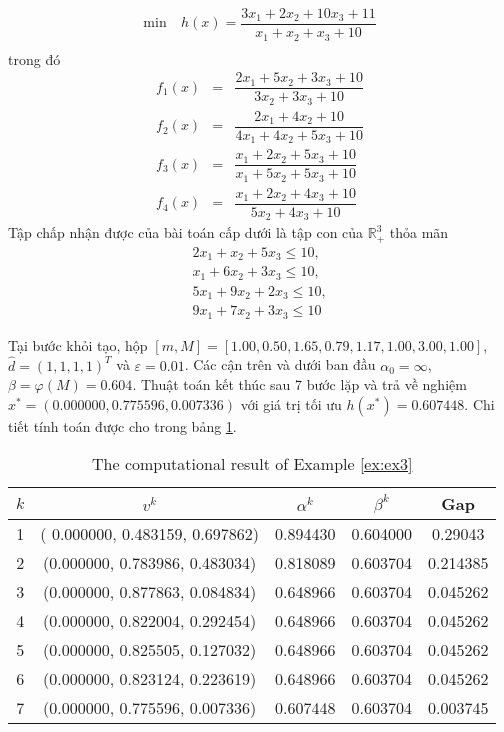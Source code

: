 \begin{vd} 
\noindent  \label{ex:ex3}
\begin{align*}
    \min &\ h(x) = \dfrac{3x_1 + 2x_2 + 10x_3 +11}{x_1 + x_2 +x_3 +10}\\
\end{align*}
trong đó 
\[
\begin{array}{ccl}
    f_1(x) & = & \dfrac{2x_{1}+5x_{2}+3x_{3}+10}{3x_{2}+3x_{3}+10} \\
    f_2(x) & = & \dfrac{2x_{1}+4x_{2}+10}{4x_{1}+4x_{2}+5x_{3}+10} \\
    f_3(x) & = & \dfrac{x_{1}+2x_{2}+5x_{3}+10}{x_{1}+5x_{2}+5x_{3}+10}\\
    f_4(x) & = & \dfrac{x_{1}+2x_{2}+4x_{3}+10}{5x_{2}+4x_{3}+10}
\end{array}
\]
Tập chấp nhận được của bài toán cấp dưới là tập con của $\mathbb{R}^3_+$ thỏa mãn
\begin{align*}
    2x_{1}+x_{2}+5x_{3} \leq 10, \\
    x_{1}+6x_{2}+3x_{3} \leq 10,\\ 
    5x_{1}+9x_{2}+2x_{3} \leq 10,\\ 
    9x_{1}+7x_{2}+3x_{3} \leq 10
\end{align*}
\end{vd}

Tại bước khỏi tạo, hộp $[m,M] =[1.00,0.50,1.65,0.79,1.17,1.00,3.00,1.00]$, $\hat{d}=(1, 1, 1, 1)^{T}$ và $\varepsilon=0.01$.
Các cận trên và dưới ban đầu $\alpha_{0}=\infty$, $\beta=\varphi(M)=0.604$. Thuật toán kết thúc sau 7 bước lặp và trả về nghiệm $x^{*}=(0.000000, 0.775596, 0.007336)$ với giá trị tối ưu $h(x^{*})=0.607448$. Chi tiết tính toán được cho trong bảng \ref{tab:ex3}.

\begin{table}[h]
\centering{}\caption{\label{tab:ex3}The computational result of Example \ref{ex:ex3}}
\begin{centering}
\begin{tabular}{ccccc}
\hline 
$k$ & $v^{k}$ & $\alpha^{k}$ & $\beta^{k}$ & Gap\tabularnewline
\hline 
\hline 
1 & ( 0.000000, 0.483159, 0.697862) & 0.894430 & 0.604000 & 0.29043 \tabularnewline
\hline 
2 & (0.000000, 0.783986, 0.483034) & 0.818089 & 0.603704 & 0.214385 \tabularnewline
\hline 
3 & (0.000000, 0.877863, 0.084834) & 0.648966 & 0.603704 & 0.045262\tabularnewline
\hline 
4 & (0.000000, 0.822004, 0.292454) & 0.648966 & 0.603704 & 0.045262\tabularnewline
\hline 
5 & (0.000000, 0.825505, 0.127032) &0.648966 & 0.603704 & 0.045262\tabularnewline
\hline
6 & (0.000000, 0.823124, 0.223619) & 0.648966 & 0.603704 & 0.045262\tabularnewline
\hline 
7 & (0.000000, 0.775596, 0.007336) &  0.607448 & 0.603704 & 0.003745\tabularnewline
\hline 
\end{tabular}
\par\end{centering}
\end{table}


